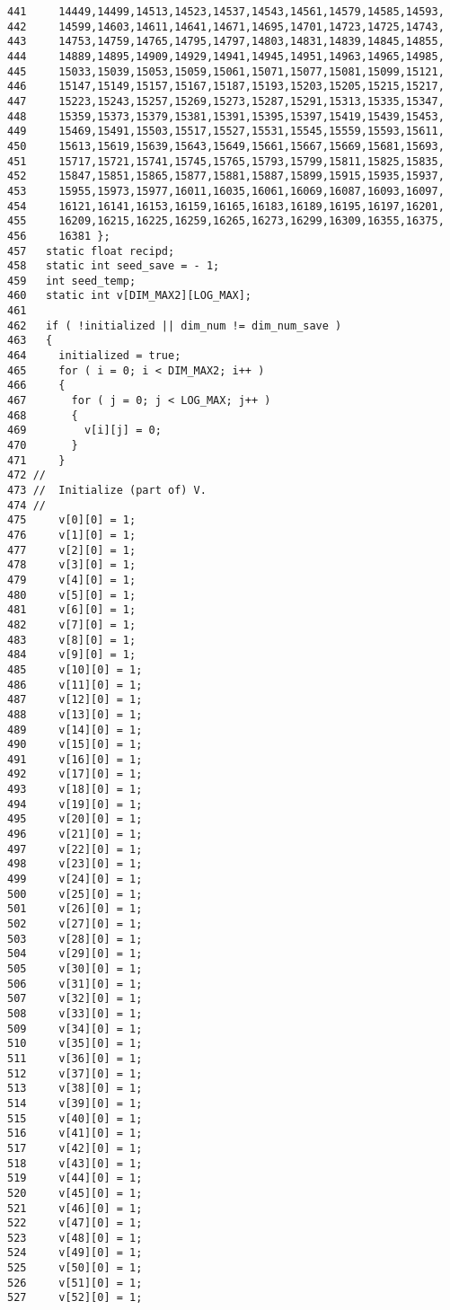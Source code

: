 \begin{Code}
\begin{verbatim}
441     14449,14499,14513,14523,14537,14543,14561,14579,14585,14593,
442     14599,14603,14611,14641,14671,14695,14701,14723,14725,14743,
443     14753,14759,14765,14795,14797,14803,14831,14839,14845,14855,
444     14889,14895,14909,14929,14941,14945,14951,14963,14965,14985,
445     15033,15039,15053,15059,15061,15071,15077,15081,15099,15121,
446     15147,15149,15157,15167,15187,15193,15203,15205,15215,15217,
447     15223,15243,15257,15269,15273,15287,15291,15313,15335,15347,
448     15359,15373,15379,15381,15391,15395,15397,15419,15439,15453,
449     15469,15491,15503,15517,15527,15531,15545,15559,15593,15611,
450     15613,15619,15639,15643,15649,15661,15667,15669,15681,15693,
451     15717,15721,15741,15745,15765,15793,15799,15811,15825,15835,
452     15847,15851,15865,15877,15881,15887,15899,15915,15935,15937,
453     15955,15973,15977,16011,16035,16061,16069,16087,16093,16097,
454     16121,16141,16153,16159,16165,16183,16189,16195,16197,16201,
455     16209,16215,16225,16259,16265,16273,16299,16309,16355,16375,
456     16381 };
457   static float recipd;
458   static int seed_save = - 1;
459   int seed_temp;
460   static int v[DIM_MAX2][LOG_MAX];
461 
462   if ( !initialized || dim_num != dim_num_save )
463   {
464     initialized = true;
465     for ( i = 0; i < DIM_MAX2; i++ )
466     {
467       for ( j = 0; j < LOG_MAX; j++ )
468       {
469         v[i][j] = 0;
470       }
471     }
472 //
473 //  Initialize (part of) V.
474 //
475     v[0][0] = 1;
476     v[1][0] = 1;
477     v[2][0] = 1;
478     v[3][0] = 1;
479     v[4][0] = 1;
480     v[5][0] = 1;
481     v[6][0] = 1;
482     v[7][0] = 1;
483     v[8][0] = 1;
484     v[9][0] = 1;
485     v[10][0] = 1;
486     v[11][0] = 1;
487     v[12][0] = 1;
488     v[13][0] = 1;
489     v[14][0] = 1;
490     v[15][0] = 1;
491     v[16][0] = 1;
492     v[17][0] = 1;
493     v[18][0] = 1;
494     v[19][0] = 1;
495     v[20][0] = 1;
496     v[21][0] = 1;
497     v[22][0] = 1;
498     v[23][0] = 1;
499     v[24][0] = 1;
500     v[25][0] = 1;
501     v[26][0] = 1;
502     v[27][0] = 1;
503     v[28][0] = 1;
504     v[29][0] = 1;
505     v[30][0] = 1;
506     v[31][0] = 1;
507     v[32][0] = 1;
508     v[33][0] = 1;
509     v[34][0] = 1;
510     v[35][0] = 1;
511     v[36][0] = 1;
512     v[37][0] = 1;
513     v[38][0] = 1;
514     v[39][0] = 1;
515     v[40][0] = 1;
516     v[41][0] = 1;
517     v[42][0] = 1;
518     v[43][0] = 1;
519     v[44][0] = 1;
520     v[45][0] = 1;
521     v[46][0] = 1;
522     v[47][0] = 1;
523     v[48][0] = 1;
524     v[49][0] = 1;
525     v[50][0] = 1;
526     v[51][0] = 1;
527     v[52][0] = 1;

\end{verbatim}
\end{Code}
